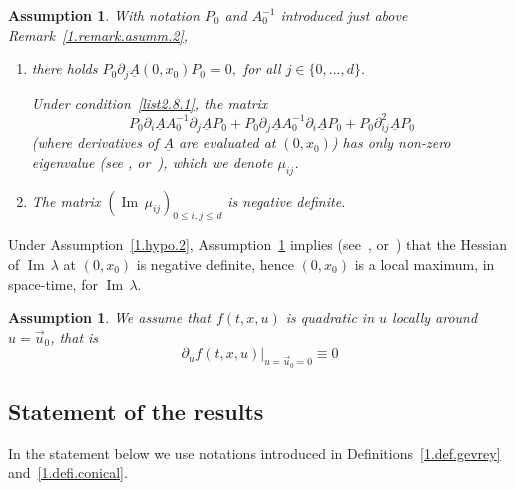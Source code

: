 \documentclass[AHL,Unicode,longabstracts,published]{cedram}
\theoremstyle{plain}
\newtheorem{hypo}[cdrthm]{Assumption} }
\newcommand{\dptl}{\partial}%
\DeclareMathOperator{\Imm}{Im}
\newcommand*{\romanenumi}{\renewcommand*{\theenumi}{\roman{enumi}}}
\begin{document}
\begin{hypo}\label{1.hypo.3}
With notation $P_0$ and $A_0^{-1}$ introduced just above Remark~\ref{1.remark.asumm.2},
\begin{enumerate}\romanenumi
\item \label{list2.8.1} there holds $P_0 \dptl_j \underline A(0,x_0) P_0 = 0,$ for all $j \in \{0, \dots, d\}.$

\emph{Under condition~\eqref{list2.8.1}, the matrix
\begin{equation}\label{1.local.assum.2}
P_0 \dptl_i \underline A A_0^{-1} \dptl_j \underline A P_0 + P_0 \dptl_j \underline A A_0^{-1} \dptl_i \underline A P_0 + P_0 \dptl_{ij}^2 \underline A P_0
\end{equation}
(where derivatives of $\underline A$ are evaluated at $(0,x_0)$) has only non-zero eigenvalue (see \cite{kato2013perturbation}, or~\cite[Proposition~2.6]{texier2004short}), which we denote $\mu_{ij}$.}
\item \label{list2.8.2}The matrix $({\Imm} \, \mu_{ij})_{0\leq i,j\leq d}$ is negative definite.
\end{enumerate}
\end{hypo}

\begin{rema}\label{1.remark.asum.3}
Under Assumption~\ref{1.hypo.2}, Assumption~\ref{1.hypo.3} implies (see~\cite{kato2013perturbation}, or~\cite[Proposition~2.6]{texier2004short}) that the Hessian of ${\Imm} \, \lambda$ at $(0,x_0)$ is negative definite, hence $(0,x_0)$ is a local maximum, in space-time, for ${\Imm} \, \lambda.$
\end{rema}

\begin{hypo}\label{1.hypo.4}
We assume that $f(t,x,u)$ is quadratic in $u$ locally around $u=\vec{u}_0$, that is
\begin{equation}\label{1.hypo.f}
\dptl_{u} f(t,x,u) \big|_{u=\vec{u}_0=0} \equiv 0
\end{equation}
\end{hypo}



\subsection{Statement of the results}\label{1.subsection.result}

In the statement below we use notations introduced in Definitions~\ref{1.def.gevrey} and~\ref{1.defi.conical}.
\end{document}
